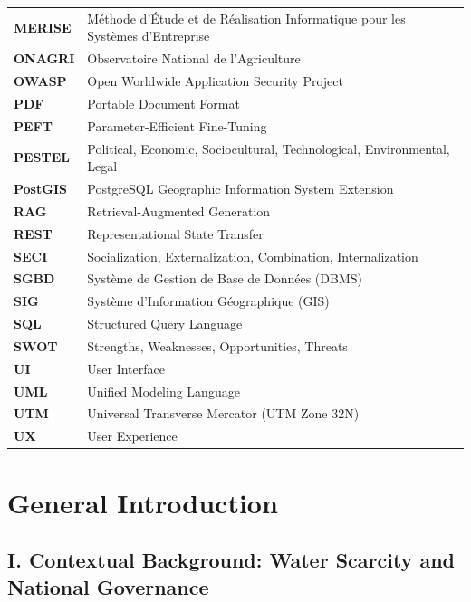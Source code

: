 \documentclass[12pt,a4paper]{report}
\begin{document}
\begin{longtable}{ll}
\textbf{MERISE} & Méthode d'Étude et de Réalisation Informatique pour les Systèmes d'Entreprise \\
\textbf{ONAGRI} & Observatoire National de l'Agriculture \\
\textbf{OWASP} & Open Worldwide Application Security Project \\
\textbf{PDF} & Portable Document Format \\
\textbf{PEFT} & Parameter-Efficient Fine-Tuning \\
\textbf{PESTEL} & Political, Economic, Sociocultural, Technological, Environmental, Legal \\
\textbf{PostGIS} & PostgreSQL Geographic Information System Extension \\
\textbf{RAG} & Retrieval-Augmented Generation \\
\textbf{REST} & Representational State Transfer \\
\textbf{SECI} & Socialization, Externalization, Combination, Internalization \\
\textbf{SGBD} & Système de Gestion de Base de Données (DBMS) \\
\textbf{SIG} & Système d'Information Géographique (GIS) \\
\textbf{SQL} & Structured Query Language \\
\textbf{SWOT} & Strengths, Weaknesses, Opportunities, Threats \\
\textbf{UI} & User Interface \\
\textbf{UML} & Unified Modeling Language \\
\textbf{UTM} & Universal Transverse Mercator (UTM Zone 32N) \\
\textbf{UX} & User Experience \\
\end{longtable}

\newpage

\chapter*{General Introduction}

\section*{I. Contextual Background: Water Scarcity and National Governance}
\end{document}

